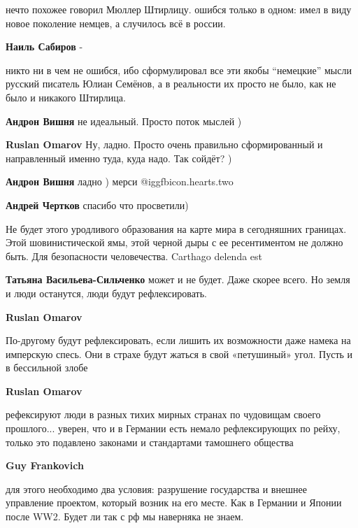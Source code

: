 \begin{itemize}
\begin{itemize}
нечто похожее говорил Мюллер Штирлицу. ошибся только в одном: имел в виду новое
поколение немцев, а случилось всё в россии.

\textbf{Наиль Сабиров} - 

никто ни в чем не ошибся, ибо сформулировал все эти якобы \enquote{немецкие} мысли
русский писатель Юлиан Семёнов, а в реальности их просто не было, как не было и
никакого Штирлица.

\textbf{Андрон Вишня} не идеальный. Просто поток мыслей )

\textbf{Ruslan Omarov} Ну, ладно. Просто очень правильно сформированный и направленный именно туда, куда надо. Так сойдёт? )

\textbf{Андрон Вишня} ладно ) мерси  @igg{fbicon.hearts.two} 

\textbf{Андрей Чертков} спасибо что просветили)
\end{itemize} %


Не будет этого уродливого образования на карте мира в сегодняшних границах.
Этой шовинистической ямы, этой черной дыры с ее ресентиментом не должно быть.
Для безопасности человечества. Carthago delenda est

\begin{itemize} %
\textbf{Татьяна Васильева-Сильченко} может и не будет. Даже скорее всего. Но земля и люди останутся, люди будут рефлексировать.

\textbf{Ruslan Omarov} 

По-другому будут рефлексировать, если лишить их возможности даже намека на
имперскую спесь. Они в страхе будут жаться в свой «петушиный» угол. Пусть и в
бессильной злобе

\textbf{Ruslan Omarov} 

рефексируют люди в разных тихих мирных странах по чудовищам своего прошлого...
уверен, что и в Германии есть немало рефлексирующих по рейху, только это
подавлено законами и стандартами тамошнего общества

\textbf{Guy Frankovich} 

для этого необходимо два условия: разрушение государства и внешнее управление
проектом, который возник на его месте. Как в Германии и Японии после WW2. Будет
ли так с рф мы наверняка не знаем.


\end{itemize}
\end{itemize}

